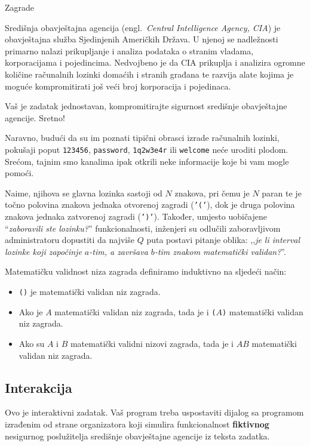 \begin{statement}[
  problempoints=100,
  timelimit=1 sekunda,
  memorylimit=512 MiB,
]{Zagrade}

Središnja obavještajna agencija (engl.\ \textit{Central Intelligence Agency,
CIA}) je obavještajna služba Sjedinjenih Američkih Država. U njenoj se
nadležnosti primarno nalazi prikupljanje i analiza podataka o stranim
vladama, korporacijama i pojedincima. Nedvojbeno je da CIA prikuplja i analizira
ogromne količine računalnih lozinki domaćih i stranih građana te razvija alate
kojima je moguće kompromitirati još veći broj korporacija i pojedinaca.

Vaš je zadatak jednostavan, kompromitirajte sigurnost središnje obavještajne
agencije. Sretno!

Naravno, budući da su im poznati tipični obrasci izrade računalnih lozinki,
pokušaji poput \texttt{123456}, \texttt{password}, \texttt{1q2w3e4r} ili
\texttt{welcome} neće uroditi plodom. Srećom, tajnim smo kanalima ipak otkrili
neke informacije koje bi vam mogle pomoći.

Naime, njihova se glavna lozinka sastoji od $N$ znakova, pri čemu je $N$ paran
te je točno polovina znakova jednaka otvorenoj zagradi (\texttt{'('}), dok je
druga polovina znakova jednaka zatvorenoj zagradi (\texttt{')'}). Također,
  umjesto uobičajene ``\textit{zaboravili ste lozinku?}'' funkcionalnosti,
inženjeri su odlučili zaboravljivom administratoru dopustiti da
najviše $Q$ puta postavi pitanje oblika: ,,\textit{je li interval lozinke koji
započinje $a$-tim, a završava $b$-tim znakom matematički validan?}''.

Matematičku validnost niza zagrada definiramo induktivno na sljedeći način:

\begin{itemize}
  \item \texttt{()} je matematički validan niz zagrada.
  \item Ako je $A$ matematički validan niz zagrada, tada je i
    \texttt{(}$A$\texttt{)} matematički validan niz zagrada.
  \item Ako su $A$ i $B$ matematički validni nizovi zagrada,
        tada je i $AB$ matematički validan niz zagrada.
\end{itemize}

\subsection*{Interakcija}
Ovo je interaktivni zadatak. Vaš program treba uspostaviti dijalog sa programom
izrađenim od strane organizatora koji simulira funkcionalnost
\textbf{fiktivnog} nesigurnog poslužitelja središnje obavještajne agencije iz
teksta zadatka.


\end{statement}
